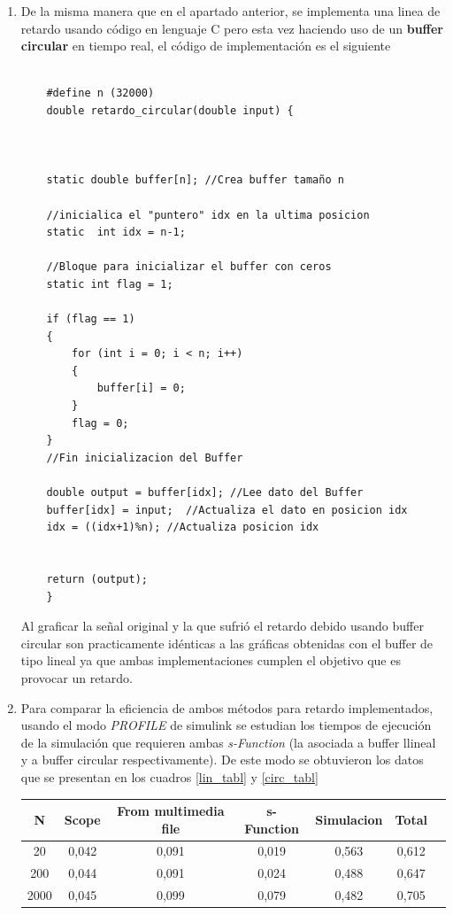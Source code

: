 \begin{enumerate}
    \item
    
    De la misma manera que en el apartado anterior, se implementa una linea de retardo usando código en lenguaje C pero esta vez haciendo uso de un \textbf{buffer circular} en tiempo real, el código de implementación es el siguiente
    
    \newpage
    \begin{lstlisting}
    
    #define n (32000)
    double retardo_circular(double input) {
    
    
    
    static double buffer[n]; //Crea buffer tamaño n
    	
    //inicialica el "puntero" idx en la ultima posicion
    static  int idx = n-1;  
    
    //Bloque para inicializar el buffer con ceros
    static int flag = 1;
    
    if (flag == 1) 
    {
    	for (int i = 0; i < n; i++) 
    	{
    		buffer[i] = 0;
    	}
        flag = 0;
    } 
    //Fin inicializacion del Buffer
    
    double output = buffer[idx]; //Lee dato del Buffer
    buffer[idx] = input;  //Actualiza el dato en posicion idx
    idx = ((idx+1)%n); //Actualiza posicion idx
    
    
    return (output);
    }

    \end{lstlisting} 
    
    Al graficar la señal original y la que sufrió el retardo debido usando buffer circular son practicamente idénticas  a las gráficas obtenidas con el buffer de tipo lineal ya que ambas implementaciones cumplen el objetivo que es provocar un retardo.
    
\item Para comparar la eficiencia de ambos métodos para retardo implementados,  usando el modo \textit{PROFILE} de simulink se estudian los tiempos de ejecución de la simulación que requieren ambas \textit{s-Function} (la asociada a buffer llineal y a buffer circular respectivamente). De este modo se obtuvieron los datos que se presentan en los cuadros \ref{lin_tabl} y \ref{circ_tabl}




\begin{table}[H]
        \centering
        \begin{tabular}{|c|c|c|c|c|c|c|}
        \hline
 N  & Scope & From multimedia file & s-Function & Simulacion & Total \\
 \hline
 20 &0,042	&0,091	&0,019	&0,563	&0,612 \\
 \hline
 200 & 0,044 &	0,091	&0,024&	0,488&	0,647 \\
 \hline
 2000 &0,045 &	0,099	&0,079&	0,482&	0,705\\
 \hline


\end{tabular}
\end{table}
\end{enumerate}
